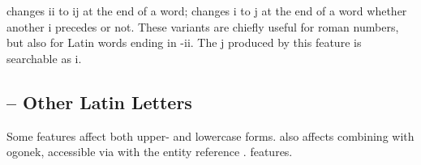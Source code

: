 \noindent *  changes ii to ij at the end of a word;
 changes i to j at the end of a word whether another
i precedes or not. These variants are chiefly useful for roman numbers, but
also for Latin words ending in -ii. The j produced by this feature is
searchable as i.

\subsection{ -- Other Latin Letters}\hypertarget{OtherLatin}{}
Some features affect both upper- and lowercase forms.  also affects
combining  with ogonek, accessible via  with the
entity reference .
features.

